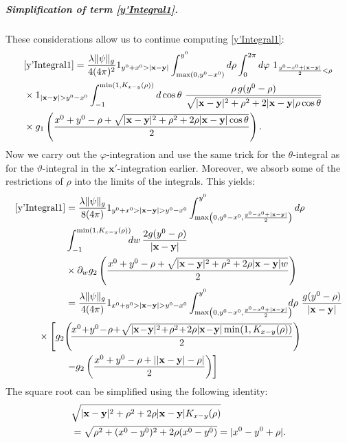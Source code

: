 \documentclass[b5paper,draft,openbib,12pt]{memoir}
\newcommand{\vx}{\mathbf{x}}
\newcommand{\vy}{\mathbf{y}}
\begin{document}
\subparagraph{Simplification of term 
\eqref{y'Integral1}.}
These considerations allow us to continue computing 
\eqref{y'Integral1}:
\begin{align}\label{casesFirstTermBeginning}
    &\eqref{y'Integral1}
    =\frac{\lambda \|\psi\|_g}{4(4\pi)^2}1_{y^0+x^0>|\vx-\vy|}  \int_{\max(0,y^0-x^0)}^{y^0} d\rho \int_{0}^{2\pi}d\varphi~ 
    1_{\frac{y^0-x^0+|\vx-\vy|}{2}<\rho}\nonumber\\ 
  &\times 1_{|\vx-\vy|>y^0-x^0} \int_{-1}^{\min(1,K_{x-y}(\rho))} d\cos\theta  ~\frac{\rho \, g(y^0-\rho)}{\sqrt{|\vx-\vy|^2+\rho^2 + 2 |\vx-\vy|\rho \cos\theta}}\nonumber\\ 
	&\times g_1\left(\frac{x^0+y^0-\rho + \sqrt{|\vx-\vy|^2+\rho^2+2\rho|\vx-\vy|\cos\theta}}{2}\right).
    \end{align}
Now we carry out the $\varphi$-integration and use the 
same trick for the $\theta$-integral as for the 
$\vartheta$-integral in the \(\vx'\)-integration 
earlier.  Moreover, we absorb some of the restrictions 
of \(\rho\) into the limits of the integrals. This 
yields:
    \begin{align}
    \eqref{y'Integral1} &=\frac{\lambda \|\psi\|_g}{8(4\pi)}  1_{y^0+x^0>|\vx-\vy|>y^0-x^0} \int_{\max\left(0,y^0-x^0,\frac{y^0-x^0+|\vx-\vy|}{2}\right)}^{y^0} d\rho \notag\\
    &\int_{-1}^{\min(1,K_{x-y}(\rho))} \!\!\! dw \, \frac{2 g(y^0-\rho)}{|\vx-\vy|}\nonumber\\
 &\times \partial_w g_2\left(\frac{x^0+y^0-\rho + \sqrt{|\vx-\vy|^2+\rho^2+2\rho|\vx-\vy|w}}{2}\right)\nonumber\\
    &= \frac{\lambda \|\psi\|_g}{4(4\pi)} 1_{x^0+y^0>|\vx-\vy|>y^0-x^0} \int_{\max\left(0,y^0-x^0,\frac{y^0-x^0+|\vx-\vy|}{2}\right)}^{y^0} \!\!\!\!d\rho~   \frac{ g(y^0-\rho)}{|\vx-\vy|}\nonumber\\ 
    &\hspace{-1cm}\times \left[ g_2\!\left(\!\frac{x^0\!+\!y^0\!-\!\rho \!+\! \sqrt{|\vx\!-\!\vy|^2\!+\!\rho^2\!+\!2\rho|\vx\!-\!\vy|\min(1,K_{x-y}(\rho))}}{2}\right)\right.\nonumber\\
    &\left.-g_2\left(\frac{x^0+y^0-\rho + ||\vx-\vy|-\rho|}{2}\right)\right]
\end{align}
The square root can be simplified using the following 
identity:
\begin{align}\notag
   &\sqrt{|\vx-\vy|^2+\rho^2+2\rho|\vx-\vy|K_{x-y}(\rho)}\\\label{PlugKIn}
   &=\sqrt{\rho^2 +(x^0-y^0)^2+2\rho (x^0-y^0)}
   =|x^0-y^0+\rho|.
\end{align}
\end{document}
